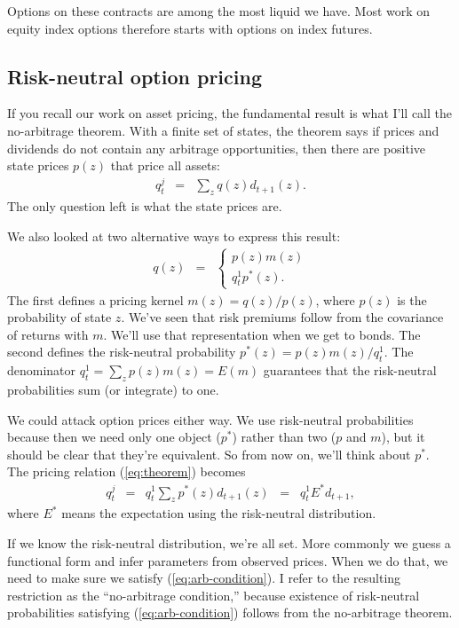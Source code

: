 \documentclass[11pt]{article}
\begin{document}
Options on these contracts are among the most liquid we have.
Most work on equity index options therefore starts with
options on index futures.


\subsection*{Risk-neutral option pricing}

If you recall our work on asset pricing,
the fundamental result is what I'll call the no-arbitrage theorem.
With a finite set of states,
the theorem says if prices and dividends do not contain any arbitrage opportunities,
then there are positive state prices $p(z)$ that price all
assets:
\begin{eqnarray}
    q^j_t  &=& \sum_z q(z) d_{t+1}(z) .
    \label{eq:theorem}
\end{eqnarray}
The only question left is what the state prices are.

We also looked at two alternative ways to express this result:
\begin{eqnarray*}
    q(z) &=& \left\{
                \begin{array}{l}
                    p(z) m(z) \\
                    q^1_t p^*(z) .
                \end{array}
            \right.
\end{eqnarray*}
The first defines a pricing kernel $m(z) = q(z)/p(z)$,
where $p(z)$ is the probability of state $z$.
We've seen that risk premiums follow from the covariance of returns with $m$.
We'll use that representation when we get to bonds.
The second defines the risk-neutral probability
$p^*(z) = p(z)m(z)/q_t^1$.
The denominator $q_t^1 = \sum_z p(z) m(z) = E(m)$ guarantees
that the risk-neutral probabilities sum (or integrate) to one.

We could attack option prices either way.
We use risk-neutral probabilities because
then we need only one object ($p^*$)
rather than two ($p$ and $m$), but it should be clear that
they're equivalent.
So from now on, we'll think about $p^*$.
The pricing relation (\ref{eq:theorem}) becomes
\begin{eqnarray}
    q^j_t  &=&  q^1_t \sum_z p^*(z) d_{t+1}(z)
            \;\;=\;\; q^1_t  E^* d_{t+1} ,
              \label{eq:arb-condition}
\end{eqnarray}
where $E^*$ means the expectation using the risk-neutral distribution.


If we know the risk-neutral distribution, we're all set.
More commonly we guess a functional form and infer parameters from
observed prices.
When we do that, we need to make sure we satisfy (\ref{eq:arb-condition}).
I refer to the resulting restriction as the ``no-arbitrage condition,''
because existence of risk-neutral probabilities satisfying (\ref{eq:arb-condition})
follows from the no-arbitrage theorem.
\end{document}
